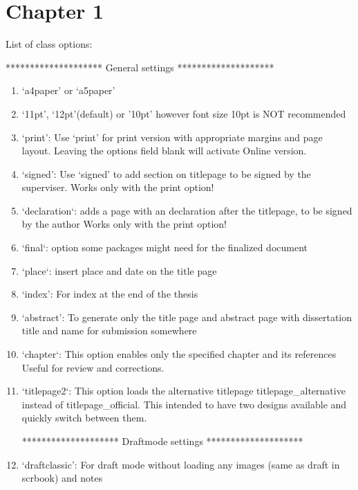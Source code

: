 \chapter{Chapter 1}\label{chap:chapter_1}
List of class options:

\begin{center}
	******************** General settings ********************
\end{center}
\begin{enumerate}
\item`a4paper' or `a5paper'

\item`11pt', `12pt'(default) or '10pt' however font size 10pt is NOT recommended

\item`print': Use `print' for print version with appropriate margins and page
 layout. Leaving the options field blank will activate Online version.

\item`signed': Use `signed' to add section on titlepage to be signed by the superviser.
 Works only with the print option!

\item`declaration`: adds a page with an declaration after the titlepage, to be signed by the author
 Works only with the print option!

\item`final`: option some packages might need for the finalized document

\item`place`: insert place and date on the title page

\item`index': For index at the end of the thesis

\item`abstract': To generate only the title page and abstract page with
 dissertation title and name for submission somewhere

\item`chapter`: This option enables only the specified chapter and its references
  Useful for review and corrections.

\item`titlepage2`: This option loads the alternative titlepage titlepage\_alternative instead of titlepage\_official. This intended to have two designs available and quickly switch between them.

\begin{center}
	******************** Draftmode settings ********************
\end{center}
\item`draftclassic': For draft mode without loading any images (same as draft in scrbook) and notes


\end{enumerate}
